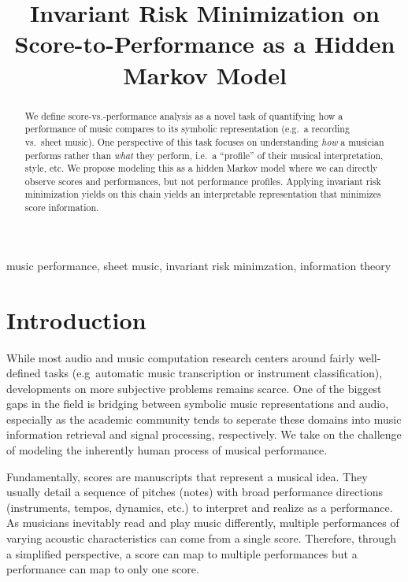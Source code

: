 \documentclass[conference]{IEEEtran}
\begin{document}
\title{Invariant Risk Minimization on Score-to-Performance as a Hidden Markov Model}

\author{
}

\maketitle

\begin{abstract}
    We define score-vs.-performance analysis as a novel task of quantifying how a performance of music compares to its symbolic representation (e.g.\ a recording vs.\ sheet music). One perspective of this task focuses on understanding \textit{how} a musician performs rather than \textit{what} they perform, i.e.\ a ``profile'' of their musical interpretation, style, etc. We propose modeling this as a hidden Markov model where we can directly observe scores and performances, but not performance profiles. Applying invariant risk minimization yields on this chain yields an interpretable representation that minimizes score information.
\end{abstract}

\begin{IEEEkeywords}
    music performance, sheet music, invariant risk minimzation, information theory
\end{IEEEkeywords}

\section{Introduction}
While most audio and music computation research centers around fairly well-defined tasks (e.g\ automatic music transcription or instrument classification), developments on more subjective problems remains scarce. One of the biggest gaps in the field is bridging between symbolic music representations and audio, especially as the academic community tends to seperate these domains into music information retrieval and signal processing, respectively. We take on the challenge of modeling the inherently human process of musical performance.

Fundamentally, scores are manuscripts that represent a musical idea. They usually detail a sequence of pitches (notes) with broad performance directions (instruments, tempos, dynamics, etc.) to interpret and realize as a performance. As musicians inevitably read and play music differently, multiple performances of varying acoustic characteristics can come from a single score. Therefore, through a simplified perspective, a score can map to multiple performances but a performance can map to only one score.
\end{document}
